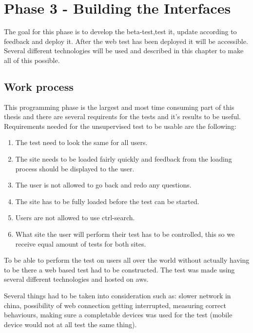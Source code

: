 
\chapter{Phase 3 - Building the Interfaces} %

\label{Chapter6} %

The goal for this phase is to develop the beta-test,test it, update according to feedback and deploy it. After the web test has been deployed it will be accessible. Several different technologies will be used and described in this chapter to make all of this possible.
\section{Work process}
This programming phase is the largest and most time consuming part of this thesis and there are several requirents for the tests and it's results to be useful. Requirements needed for the unsupervised test to be usable are the following:

\begin{enumerate}
	\item The test need to look the same for all users.
	\item The site needs to be loaded fairly quickly and feedback from the loading process should be displayed to the user.
	\item The user is not allowed to go back and redo any questions.
	\item The site has to be fully loaded before the test can be started.
	\item Users are not allowed to use ctrl-search.
	\item What site the user will perform their test has to be controlled, this so we receive equal amount of tests for both sites.
\end{enumerate}

To be able to perform the test on users all over the world without actually having to be there a web based test had to be constructed. The test was made using several different technologies and hosted on aws. 

Several things had to be taken into consideration such as: slower network in china, possibility of web connection getting interrupted, measuring correct behaviours, making sure a completable devices was used for the test (mobile device would not at all test the same thing).


